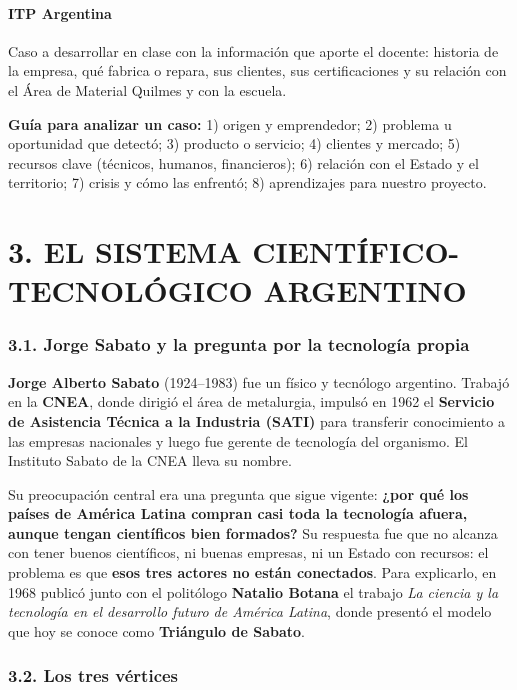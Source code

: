 \paragraph*{ITP Argentina}
Caso a desarrollar en clase con la información que aporte el docente: historia de la empresa,
qué fabrica o repara, sus clientes, sus certificaciones y su relación con el Área de Material
Quilmes y con la escuela.

\begin{recuadro}
\textbf{Guía para analizar un caso:} 1) origen y emprendedor; 2) problema u oportunidad que
detectó; 3) producto o servicio; 4) clientes y mercado; 5) recursos clave (técnicos,
humanos, financieros); 6) relación con el Estado y el territorio; 7) crisis y cómo las
enfrentó; 8) aprendizajes para nuestro proyecto.
\end{recuadro}

\section*{3. EL SISTEMA CIENTÍFICO-TECNOLÓGICO ARGENTINO}

\subsubsection*{3.1. Jorge Sabato y la pregunta por la tecnología propia}
\textbf{Jorge Alberto Sabato} (1924--1983) fue un físico y tecnólogo argentino. Trabajó en la
\textbf{CNEA}, donde dirigió el área de metalurgia, impulsó en 1962 el \textbf{Servicio de
Asistencia Técnica a la Industria (SATI)} para transferir conocimiento a las empresas
nacionales y luego fue gerente de tecnología del organismo. El Instituto Sabato de la CNEA
lleva su nombre.

Su preocupación central era una pregunta que sigue vigente: \textbf{¿por qué los países de
América Latina compran casi toda la tecnología afuera, aunque tengan científicos bien
formados?} Su respuesta fue que no alcanza con tener buenos científicos, ni buenas empresas,
ni un Estado con recursos: el problema es que \textbf{esos tres actores no están conectados}.
Para explicarlo, en 1968 publicó junto con el politólogo \textbf{Natalio Botana} el trabajo
\textit{La ciencia y la tecnología en el desarrollo futuro de América Latina}, donde presentó
el modelo que hoy se conoce como \textbf{Triángulo de Sabato}.

\subsubsection*{3.2. Los tres vértices}

